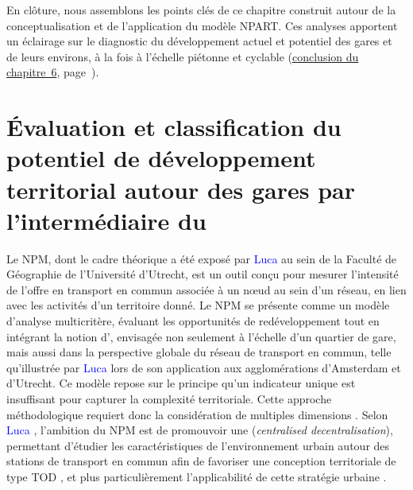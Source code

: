 \begin{refsegment}
En clôture, nous assemblons les points clés de ce chapitre construit autour de la conceptualisation et de l’application du modèle \acrshort{NPART}. Ces analyses apportent un éclairage sur le diagnostic du développement actuel et potentiel des gares et de leurs environs, à la fois à l’échelle piétonne et cyclable (\hyperref[chap6:conclusion]{conclusion du chapitre~6}, page~\pageref{chap6:conclusion}).%

    \newpage
\section{Évaluation et classification du potentiel de développement territorial autour des gares par l'intermédiaire du 
    \label{chap6:revue-litterature-m-tod-index}
    }

Le \acrfull{NPM}, dont le cadre théorique a été exposé par \textcolor{blue}{Luca} \textcolor{blue}{\textcite[343]{bertolini_nodes_1996}} au sein de la Faculté de Géographie de l'Université d'Utrecht, est un outil conçu pour mesurer l'intensité de l'offre en transport en commun associée à un nœud au sein d'un réseau, en lien avec les activités d'un territoire donné. Le \acrshort{NPM} se présente comme un modèle d'analyse multicritère, évaluant les opportunités de redéveloppement tout en intégrant la notion d', envisagée non seulement à l'échelle d'un quartier de gare, mais aussi dans la perspective globale du réseau de transport en commun, telle qu'illustrée par \textcolor{blue}{Luca} \textcolor{blue}{\textcite[206]{bertolini_spatial_1999}} lors de son application aux agglomérations d'Amsterdam et d'Utrecht. Ce modèle repose sur le principe qu'un indicateur unique est insuffisant pour capturer la complexité territoriale. Cette approche méthodologique requiert donc la considération de multiples dimensions \textcolor{blue}{\autocite[5]{arliani_measuring_2023}}. Selon \textcolor{blue}{Luca} \textcolor{blue}{\textcite[200]{bertolini_spatial_1999}}, l'ambition du \acrshort{NPM} est de promouvoir une  (\textsl{centralised decentralisation}), permettant d'étudier les caractéristiques de l'environnement urbain autour des stations de transport en commun afin de favoriser une conception territoriale de type \acrfull{TOD} \textcolor{blue}{\autocite[55]{kamruzzaman_advance_2014}}, et plus particulièrement l'applicabilité de cette stratégie urbaine \textcolor{blue}{\autocites[516-517]{filion_smart_2007}[97]{curtis_delivering_2012}}.%


\end{refsegment}
